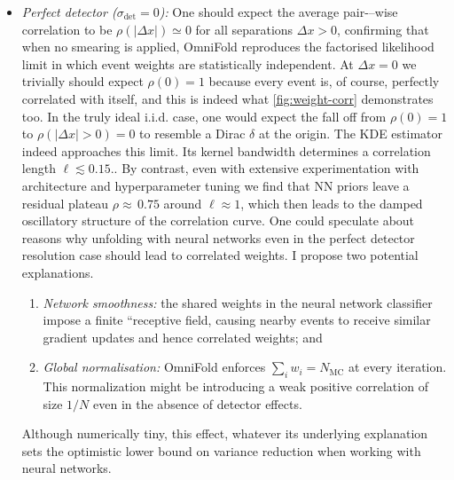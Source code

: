             \begin{itemize}
            \item \emph{Perfect detector ($\sigma_{\det}=0$):}
                One should expect the average pair-–wise correlation to be $\rho(|\Delta x|)\!\simeq\!0$ for all separations $\Delta x>0$, confirming that when no smearing is applied, OmniFold reproduces the {factorised likelihood} limit in which event weights are statistically independent.
                At $\Delta x = 0$ we trivially should expect $\rho(0)=1$ because every event is, of course, perfectly correlated with itself, and this is indeed what \cref{fig:weight-corr} demonstrates too.
                In the truly ideal i.i.d. case, one would expect the fall off from $\rho(0)=1$ to $\rho(|\Delta  x|>0)\!=\!0$ to resemble a Dirac $\delta$ at the origin.
                The {KDE} estimator indeed approaches this limit.
                Its kernel bandwidth determines a correlation length \(\ell \lesssim\!0.15\)..
                By contrast, even with extensive experimentation with architecture and hyperparameter tuning we find that {NN} priors leave a residual plateau $\rho\!\approx\!$\,$0.75$ around $\ell\!\approx\!1$, which then leads to the damped oscillatory structure of the correlation curve.
                One could speculate about reasons why unfolding with neural networks even in the perfect detector resolution case should lead to correlated weights.
                I propose two potential explanations.
                \begin{enumerate}
                    \item \emph{Network smoothness:} the shared weights in the neural network classifier impose a finite ``receptive field,  causing nearby events to receive similar gradient updates and hence correlated weights; and
                    \item \emph{Global normalisation:} OmniFold enforces $\sum_i w_i = N_{\text{MC}}$ at every iteration.
                    This normalization might be introducing a weak positive correlation of size $1/N$ even in the absence of detector effects. 
                \end{enumerate}
                Although numerically tiny, this effect, whatever its underlying explanation sets the optimistic lower bound on variance reduction when working with neural networks.

\end{itemize}
